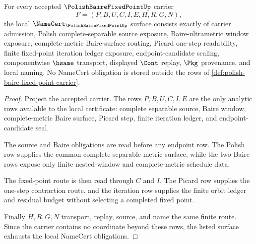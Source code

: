 \begin{theorem}
\label{thm:polish-baire-fixed-point-namecert-obligations}
For every accepted $\PolishBaireFixedPointUp$ carrier
$$
F=(P,B,U,C,I,E,H,R,G,N),
$$
the local $\NameCert_{\PolishBaireFixedPointUp}$ surface consists exactly of carrier admission, Polish complete-separable source exposure, Baire-ultrametric window exposure, complete-metric Baire-surface routing, Picard one-step readability, finite fixed-point iteration ledger exposure, endpoint-candidate sealing, componentwise $\hsame$ transport, displayed $\Cont$ replay, $\Pkg$ provenance, and local naming. No NameCert obligation is stored outside the rows of \autoref{def:polish-baire-fixed-point-carrier}.
\end{theorem}
\begin{proof}
Project the accepted carrier. The rows $P,B,U,C,I,E$ are the only analytic rows available to the local certificate: complete separable source, Baire window, complete-metric Baire surface, Picard step, finite iteration ledger, and endpoint-candidate seal.

The source and Baire obligations are read before any endpoint row. The Polish row supplies the common complete-separable metric surface, while the two Baire rows expose only finite nested-window and complete-metric schedule data.

The fixed-point route is then read through $C$ and $I$. The Picard row supplies the one-step contraction route, and the iteration row supplies the finite orbit ledger and residual budget without selecting a completed fixed point.

Finally $H,R,G,N$ transport, replay, source, and name the same finite route. Since the carrier contains no coordinate beyond these rows, the listed surface exhausts the local NameCert obligations.
\end{proof}

